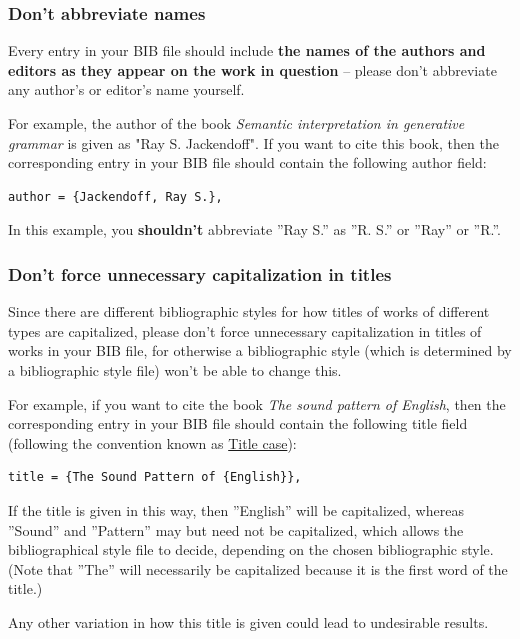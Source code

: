 \subsubsection*{Don't abbreviate names}

Every entry in your BIB file should include \textbf{the names of the authors and editors as they appear on the work in question} -- please don't abbreviate any author's or editor's name yourself.

For example, the author of the book \emph{Semantic interpretation in generative grammar} is given as "Ray S. Jackendoff". If you want to cite this book, then the corresponding entry in your BIB file should contain the following author field:

\begin{verbatim}
author = {Jackendoff, Ray S.},
\end{verbatim}

In this example, you \textbf{shouldn't} abbreviate ''Ray S.'' as ''R. S.'' or ''Ray'' or ''R.''.

\subsubsection*{Don't force unnecessary capitalization in titles}

Since there are different bibliographic styles for how titles of works of different types are capitalized, please don't force unnecessary capitalization in titles of works in your BIB file, for otherwise a bibliographic style (which is determined by a bibliographic style file) won't be able to change this.

For example, if you want to cite the book \emph{The sound pattern of English}, then the corresponding entry in your BIB file should contain the following title field (following the convention known as \href{https://en.wikipedia.org/wiki/Letter_case#Title_case}{Title case}):

\begin{verbatim}
title = {The Sound Pattern of {English}},
\end{verbatim}

If the title is given in this way, then ''English'' will be capitalized, whereas ''Sound'' and ''Pattern'' may but need not be capitalized, which allows the bibliographical style file to decide, depending on the chosen bibliographic style. (Note that ''The'' will necessarily be capitalized because it is the first word of the title.)

Any other variation in how this title is given could lead to undesirable results.

